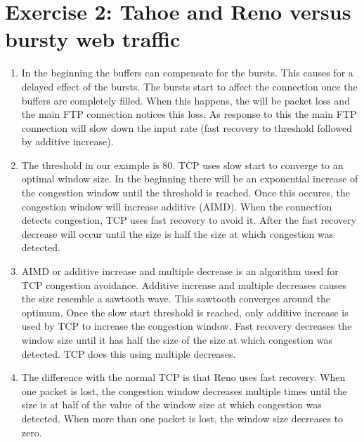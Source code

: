 \documentclass[a4paper,12pt,titlepage]{report}
\begin{document}
\section{Exercise 2: Tahoe and Reno versus bursty web traffic}
\begin{enumerate}
\item
In the beginning the buffers can compensate for the bursts. This causes for a delayed effect of the bursts. The bursts start to affect the connection once the buffers are completely filled. When this happens, the will be packet loss and the main FTP connection notices this loss. As response to this the main FTP connection will slow down the input rate (fast recovery to threshold followed by additive increase).

\item
The threshold in our example is 80. TCP uses slow start to converge to an optimal window size. In the beginning there will be an exponential increase of the congestion window until the threshold is reached. Once this occures, the congestion window will increase additive (AIMD). When the connection detects congestion, TCP uses fast recovery to avoid it. After the fast recovery decrease will occur until the size is half the size at which congestion was detected.

\item
AIMD or additive increase and multiple decrease is an algorithm used for TCP congestion avoidance. Additive increase and multiple decreases causes the size resemble a sawtooth wave.
This sawtooth converges around the optimum. Once the slow start threshold is reached, only additive increase is used by TCP to increase the congestion window. Fast recovery decreases the window size until it has half the size of the size at which congestion was detected. TCP does this using multiple decreases.

\item
The difference with the normal TCP is that Reno uses fast recovery. When one packet is lost, the congestion window decreases multiple times until the size is at half of the value of the window size at which congestion was detected. When more than one packet is lost, the window size decreases to zero.

\end{enumerate}
\end{document}

